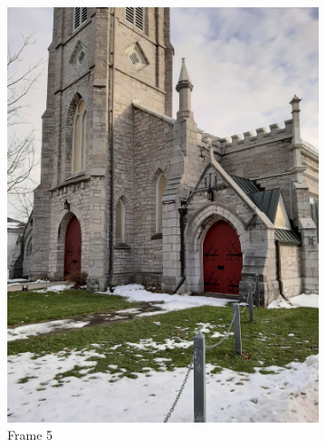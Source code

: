 \documentclass[conference]{IEEEtran}
\begin{document}
\begin{figure}[!h]
\begin{subfigure}[b]{0.2\linewidth}
    \includegraphics[width=\linewidth, angle = -90]{images/frame5.jpg}
    \caption{Frame 5}
  \end{subfigure}
  \begin{subfigure}[b]{0.2\linewidth}

\end{subfigure}
\end{figure}
\end{document}

